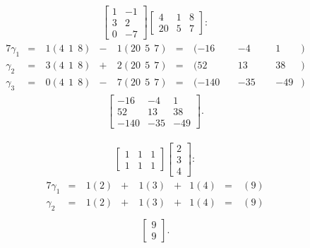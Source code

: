 \documentclass[12pt]{article}
\begin{document}
\begin{exm}
  \begin{align*}
    \begin{bmatrix}
      1 & -1\\
      3 & 2\\
      0 & -7
    \end{bmatrix}
    \begin{bmatrix}
      4  & 1 & 8\\
      20 & 5 & 7
    \end{bmatrix}:
  \end{align*}
  \begin{alignat*}{7}
    \gamma_1 &=&\ 1(4\ \ 1\ \ 8) &-&\ 1(20\ \ 5\ \ 7)
      &=&\ (-16&\ &-4&\ \ &1&)\\
    \gamma_2 &=&\ 3(4\ \ 1\ \ 8) &+&\ 2(20\ \ 5\ \ 7)
      &=&\ (52&\ &13&\ \ &38&)\\
    \gamma_3 &=&\ 0(4\ \ 1\ \ 8) &-&\ 7(20\ \ 5\ \ 7)
      &=&\ (-140&\ &-35&\ \ &-49&)
  \end{alignat*}
  \begin{align*}
    \begin{bmatrix}
      -16 & -4 & 1\\
      52 & 13 & 38\\
      -140 & -35  & -49
    \end{bmatrix}.
  \end{align*}
\end{exm}

\begin{exm}
  \begin{align*}
    \begin{bmatrix}
      1 & 1 & 1\\
      1 & 1 & 1
    \end{bmatrix}
    \begin{bmatrix}
      2\\
      3\\
      4
    \end{bmatrix}:
  \end{align*}
  \begin{alignat*}{7}
    \gamma_1 &=&\ 1(2) &+&\ 1(3) &+& 1(4) &=&\ (9)\\
    \gamma_2 &=&\ 1(2) &+&\ 1(3) &+& 1(4) &=&\ (9)\\
  \end{alignat*}
  \begin{align*}
    \begin{bmatrix}
      9\\
      9
    \end{bmatrix}.
  \end{align*}
\end{exm}
\end{document}
